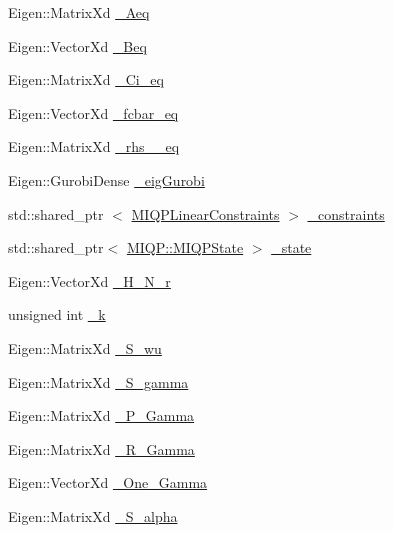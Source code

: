 \begin{DoxyCompactItemize}
\item 
\-Eigen\-::\-Matrix\-Xd \hyperlink{classMIQPController_abc22f1db5a2dbcab4006c1b903a19c4e}{\-\_\-\-Aeq}
\item 
\-Eigen\-::\-Vector\-Xd \hyperlink{classMIQPController_a59bee510bcc945ad2267a82ec2116d79}{\-\_\-\-Beq}
\item 
\-Eigen\-::\-Matrix\-Xd \hyperlink{classMIQPController_a60d2b06d2d130a874ae3d14c97176f34}{\-\_\-\-Ci\-\_\-eq}
\item 
\-Eigen\-::\-Vector\-Xd \hyperlink{classMIQPController_a338af9b8197f5b08f4e05f2e31342037}{\-\_\-fcbar\-\_\-eq}
\item 
\-Eigen\-::\-Matrix\-Xd \hyperlink{classMIQPController_aa8e6df5286125975521b77501e792413}{\-\_\-rhs\-\_\-\_\-eq}
\item 
\-Eigen\-::\-Gurobi\-Dense \hyperlink{classMIQPController_a6d15db521a6b9c4e0b641709fef77373}{\-\_\-eig\-Gurobi}
\item 
std\-::shared\-\_\-ptr\*
$<$ \hyperlink{classMIQPLinearConstraints}{\-M\-I\-Q\-P\-Linear\-Constraints} $>$ \hyperlink{classMIQPController_affac62ccd729155720b16de3137ef3f5}{\-\_\-constraints}
\item 
std\-::shared\-\_\-ptr$<$ \hyperlink{classMIQP_1_1MIQPState}{\-M\-I\-Q\-P\-::\-M\-I\-Q\-P\-State} $>$ \hyperlink{classMIQPController_aeaa4c96afe2d1d975667338e858f4a90}{\-\_\-state}
\item 
\-Eigen\-::\-Vector\-Xd \hyperlink{classMIQPController_a03c53b7f316d43dfe1aa60eba628819c}{\-\_\-\-H\-\_\-\-N\-\_\-r}
\item 
unsigned int \hyperlink{classMIQPController_af60e2d5a786f4af4fa445dea6ba1b625}{\-\_\-k}
\item 
\-Eigen\-::\-Matrix\-Xd \hyperlink{classMIQPController_a3af5e6941ac9d9896e3ad67830115108}{\-\_\-\-S\-\_\-wu}
\item 
\-Eigen\-::\-Matrix\-Xd \hyperlink{classMIQPController_aaac5bbe321ab1e620d6fe602da6c1f59}{\-\_\-\-S\-\_\-gamma}
\item 
\-Eigen\-::\-Matrix\-Xd \hyperlink{classMIQPController_a2eb96aa1ababc704065fe301aeb394f7}{\-\_\-\-P\-\_\-\-Gamma}
\item 
\-Eigen\-::\-Matrix\-Xd \hyperlink{classMIQPController_aba668abb8294cd636d67ae66e8c00daf}{\-\_\-\-R\-\_\-\-Gamma}
\item 
\-Eigen\-::\-Vector\-Xd \hyperlink{classMIQPController_ab3b52f6aa31c58a28e4d2edc287f7795}{\-\_\-\-One\-\_\-\-Gamma}
\item 
\-Eigen\-::\-Matrix\-Xd \hyperlink{classMIQPController_af10211a576dde9197e6b6af617d2bc6c}{\-\_\-\-S\-\_\-alpha}

\end{DoxyCompactItemize}
